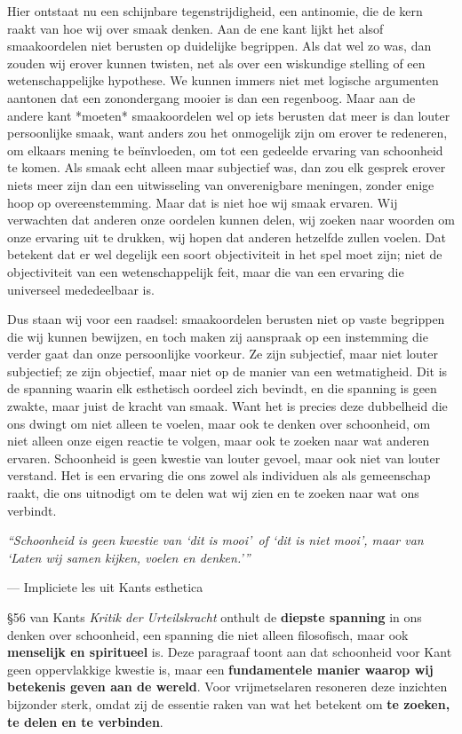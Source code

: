 \begin{mdframed}[leftmargin=0pt,rightmargin=0pt,backgroundcolor=blue!6,linecolor=white,innertopmargin=6pt,innerbottommargin=6pt]
Hier ontstaat nu een schijnbare tegenstrijdigheid, een antinomie, die de kern raakt van hoe wij over smaak denken. Aan de ene kant lijkt het alsof smaakoordelen niet berusten op duidelijke begrippen. Als dat wel zo was, dan zouden wij erover kunnen twisten, net als over een wiskundige stelling of een wetenschappelijke hypothese. We kunnen immers niet met logische argumenten aantonen dat een zonondergang mooier is dan een regenboog. Maar aan de andere kant *moeten* smaakoordelen wel op iets berusten dat meer is dan louter persoonlijke smaak, want anders zou het onmogelijk zijn om erover te redeneren, om elkaars mening te beïnvloeden, om tot een gedeelde ervaring van schoonheid te komen. Als smaak echt alleen maar subjectief was, dan zou elk gesprek erover niets meer zijn dan een uitwisseling van onverenigbare meningen, zonder enige hoop op overeenstemming. Maar dat is niet hoe wij smaak ervaren. Wij verwachten dat anderen onze oordelen kunnen delen, wij zoeken naar woorden om onze ervaring uit te drukken, wij hopen dat anderen hetzelfde zullen voelen. Dat betekent dat er wel degelijk een soort objectiviteit in het spel moet zijn; niet de objectiviteit van een wetenschappelijk feit, maar die van een ervaring die universeel mededeelbaar is.

Dus staan wij voor een raadsel: smaakoordelen berusten niet op vaste begrippen die wij kunnen bewijzen, en toch maken zij aanspraak op een instemming die verder gaat dan onze persoonlijke voorkeur. Ze zijn subjectief, maar niet louter subjectief; ze zijn objectief, maar niet op de manier van een wetmatigheid. Dit is de spanning waarin elk esthetisch oordeel zich bevindt, en die spanning is geen zwakte, maar juist de kracht van smaak. Want het is precies deze dubbelheid die ons dwingt om niet alleen te voelen, maar ook te denken over schoonheid, om niet alleen onze eigen reactie te volgen, maar ook te zoeken naar wat anderen ervaren. Schoonheid is geen kwestie van louter gevoel, maar ook niet van louter verstand. Het is een ervaring die ons zowel als individuen als als gemeenschap raakt, die ons uitnodigt om te delen wat wij zien en te zoeken naar wat ons verbindt.

\bigskip


\epigraph{\textit{``Schoonheid is geen kwestie van \textquoteleft dit is mooi\textquoteright\ of \textquoteleft dit is niet mooi\textquoteright, maar van \textquoteleft Laten wij samen kijken, voelen en denken.\textquoteright''}}{--- Impliciete les uit Kants esthetica}

§56 van Kants \textit{Kritik der Urteilskracht} onthult de \textbf{diepste spanning} in ons denken over schoonheid, een spanning die niet alleen filosofisch, maar ook \textbf{menselijk en spiritueel} is. Deze paragraaf toont aan dat schoonheid voor Kant geen oppervlakkige kwestie is, maar een \textbf{fundamentele manier waarop wij betekenis geven aan de wereld}. Voor vrijmetselaren resoneren deze inzichten bijzonder sterk, omdat zij de essentie raken van wat het betekent om \textbf{te zoeken, te delen en te verbinden}.


\end{mdframed}
